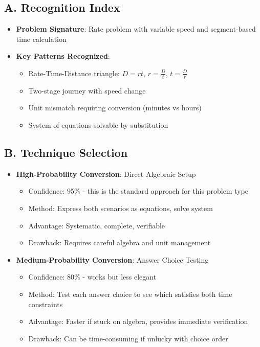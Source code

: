 \documentclass[11pt]{article}
\begin{document}
\begin{conversionbox}
\subsection*{A. Recognition Index}
\begin{itemize}[leftmargin=*]
    \item \textbf{Problem Signature}: Rate problem with variable speed and segment-based time calculation
    \item \textbf{Key Patterns Recognized}:
    \begin{itemize}[leftmargin=*]
        \item Rate-Time-Distance triangle: $D = rt$, $r = \frac{D}{t}$, $t = \frac{D}{r}$
        \item Two-stage journey with speed change
        \item Unit mismatch requiring conversion (minutes vs hours)
        \item System of equations solvable by substitution
    \end{itemize}
\end{itemize}

\subsection*{B. Technique Selection}
\begin{itemize}[leftmargin=*]
    \item \textbf{High-Probability Conversion}: Direct Algebraic Setup
    \begin{itemize}[leftmargin=*]
        \item Confidence: 95\% - this is the standard approach for this problem type
        \item Method: Express both scenarios as equations, solve system
        \item Advantage: Systematic, complete, verifiable
        \item Drawback: Requires careful algebra and unit management
    \end{itemize}
    
    \item \textbf{Medium-Probability Conversion}: Answer Choice Testing
    \begin{itemize}[leftmargin=*]
        \item Confidence: 80\% - works but less elegant
        \item Method: Test each answer choice to see which satisfies both time constraints
        \item Advantage: Faster if stuck on algebra, provides immediate verification
        \item Drawback: Can be time-consuming if unlucky with choice order
    \end{itemize}
    

\end{itemize}
\end{conversionbox}
\end{document}
